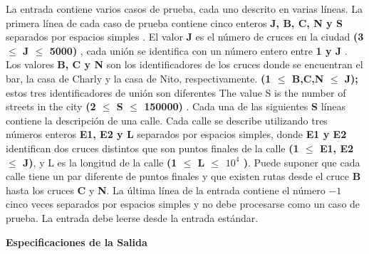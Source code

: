 \documentclass{article}
\begin{document}
    \begin{flushleft}
    La entrada contiene varios casos de prueba, cada uno descrito 
    en varias l\'ineas. La primera l\'inea de cada caso de prueba
    contiene cinco enteros {\bf J, B, C, N y S} separados por espacios
    simples . El valor {\bf J} es el n\'umero de cruces en la ciudad
    {\bf  (3 $\leq$ J $\leq$ 5000)} , cada uni\'on se identifica con un
    n\'umero entero entre {\bf 1 y J} . Los valores {\bf B, C y N} son 
    los identificadores de los cruces donde se encuentran el bar,
    la casa de Charly y la casa de Nito, respectivamente. {\bf (1 $\leq$ B,C,N $\leq$ J);}
    estos tres identificadores de uni\'on son diferentes 
    The value S is the number of streets in the city 
    {\bf (2 $\leq$ S $\leq$ 150000)} .
    Cada una de las siguientes {\bf S} l\'ineas  contiene la descripci\'on de una calle. 
    Cada calle se describe utilizando tres n\'umeros enteros {\bf E1, E2 y L} separados 
    por espacios simples, donde {\bf E1 y E2} identifican dos cruces distintos que son
    puntos finales de la calle {\bf (1 $\leq$ E1, E2 $\leq$ J)}, y L es la longitud de 
    la calle {\bf(1 $\leq$ L $\leq$ $10^4$ )}. Puede suponer que 
    cada calle tiene un par diferente de puntos finales y 
    que existen rutas desde el cruce {\bf B} hasta los cruces {\bf C} y {\bf N}. 
    La \'ultima l\'inea de la entrada contiene 
    el n\'umero $-1$ cinco veces separados por espacios simples y no debe procesarse como
    un caso de prueba. La entrada debe leerse desde la entrada est\'andar. 
    \end{flushleft}


    \begin{flushleft}
        {\bf Especificaciones de la Salida}
    \end{flushleft}
\end{document}
